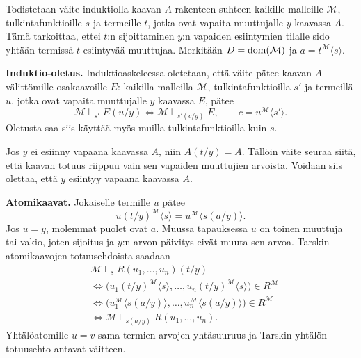 \documentclass[11pt,a4paper]{amsart}
\begin{document}
\begin{solution}
  Todistetaan väite induktiolla kaavan \(A\) rakenteen suhteen kaikille
  malleille \(\mathcal M\), tulkintafunktioille \(s\) ja termeille
  \(t\), jotka ovat vapaita muuttujalle \(y\) kaavassa \(A\).
  Tämä tarkoittaa, ettei \(t\):n sijoittaminen \(y\):n vapaiden
  esiintymien tilalle sido yhtään termissä \(t\) esiintyvää muuttujaa.
  Merkitään \(D=\operatorname{dom}(\mathcal M)\) ja
  \(a=t^{\mathcal M}\langle s\rangle\).

  \textbf{Induktio-oletus.} Induktioaskeleessa oletetaan, että väite
  pätee kaavan \(A\) välittömille osakaavoille \(E\): kaikilla
  malleilla \(\mathcal M\), tulkintafunktioilla \(s'\) ja termeillä
  \(u\), jotka ovat vapaita muuttujalle \(y\) kaavassa \(E\), pätee
  \[
    \mathcal M\models_{s'}E(u/y)
    \iff \mathcal M\models_{s'(c/y)}E,
    \qquad c=u^{\mathcal M}\langle s'\rangle.
  \]
  Oletusta saa siis käyttää myös muilla tulkintafunktioilla kuin \(s\).

  Jos \(y\) ei esiinny vapaana kaavassa \(A\), niin \(A(t/y)=A\).
  Tällöin väite seuraa siitä, että kaavan totuus riippuu vain sen
  vapaiden muuttujien arvoista. Voidaan siis olettaa, että \(y\)
  esiintyy vapaana kaavassa \(A\).

  \textbf{Atomikaavat.} Jokaiselle termille \(u\) pätee
  \[
    u(t/y)^{\mathcal M}\langle s\rangle
    =u^{\mathcal M}\langle s(a/y)\rangle.
  \]
  Jos \(u=y\), molemmat puolet ovat \(a\). Muussa tapauksessa \(u\)
  on toinen muuttuja tai vakio, joten sijoitus ja \(y\):n arvon päivitys
  eivät muuta sen arvoa. Tarskin atomikaavojen totuusehdoista saadaan
  \[
    \begin{aligned}
      &\mathcal M\models_s R(u_1,\ldots,u_n)(t/y)\\
      &\iff \bigl(u_1(t/y)^{\mathcal M}\langle s\rangle,\ldots,
      u_n(t/y)^{\mathcal M}\langle s\rangle\bigr)\in R^{\mathcal M}\\
      &\iff \bigl(u_1^{\mathcal M}\langle s(a/y)\rangle,\ldots,
      u_n^{\mathcal M}\langle s(a/y)\rangle\bigr)\in R^{\mathcal M}\\
      &\iff \mathcal M\models_{s(a/y)}R(u_1,\ldots,u_n).
    \end{aligned}
  \]
  Yhtälöatomille \(u=v\) sama termien arvojen yhtäsuuruus ja Tarskin
  yhtälön totuusehto antavat väitteen.


\end{solution}
\end{document}
